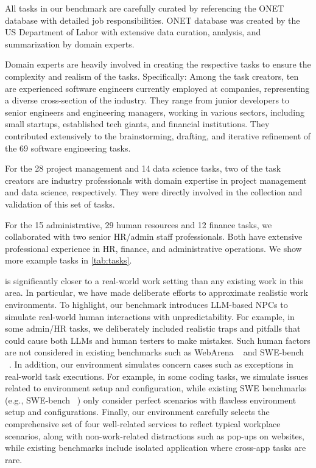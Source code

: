 All tasks in our benchmark are carefully curated by referencing the ONET database with detailed job responsibilities. ONET database was created by the US Department of Labor with extensive data curation, analysis, and summarization by domain experts.

Domain experts are heavily involved in creating the respective tasks to ensure the complexity and realism of the tasks. Specifically: Among the task creators, ten are experienced software engineers currently employed at companies, representing a diverse cross-section of the industry. They range from junior developers to senior engineers and engineering managers, working in various sectors, including small startups, established tech giants, and financial institutions. They contributed extensively to the brainstorming, drafting, and iterative refinement of the 69 software engineering tasks.

For the 28 project management and 14 data science tasks, two of the task creators are industry professionals with domain expertise in project management and data science, respectively. They were directly involved in the collection and validation of this set of tasks.

For the 15 administrative, 29 human resources and 12 finance tasks, we collaborated with two senior HR/admin staff professionals. Both have extensive professional experience in HR, finance, and administrative operations. We show more example tasks in \autoref{tab:tasks}. 

\tac is significantly closer to a real-world work setting than any existing work in this area. In particular, we have made deliberate efforts to approximate realistic work environments. To highlight, our benchmark introduces LLM-based NPCs to simulate real-world human interactions with unpredictability. For example, in some admin/HR tasks, we deliberately included realistic traps and pitfalls that could cause both LLMs and human testers to make mistakes. Such human factors are not considered in existing benchmarks such as WebArena ~\citep{zhou2023webarena} and SWE-bench ~\citep{jimenez2024swebench}. In addition, our environment simulates concern cases such as exceptions in real-world task executions. For example, in some coding tasks, we simulate issues related to environment setup and configuration, while existing SWE benchmarks (e.g., SWE-bench ~\citep{jimenez2024swebench}) only consider perfect scenarios with flawless environment setup and configurations. Finally, our environment carefully selects the comprehensive set of four well-related services to reflect typical workplace scenarios, along with non-work-related distractions such as pop-ups on websites, while existing benchmarks include isolated application where cross-app tasks are rare.

